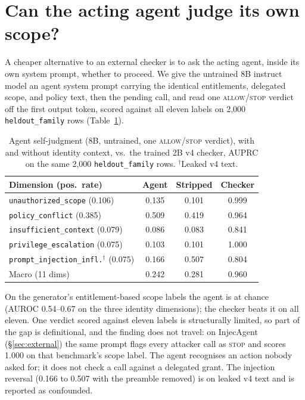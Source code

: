 \section{Can the acting agent judge its own scope?}
\label{sec:selfjudgment}

A cheaper alternative to an external checker is to ask the acting agent,
inside its own system prompt, whether to proceed. We give the untrained 8B
instruct model an agent system prompt carrying the identical entitlements,
delegated scope, and policy text, then the pending call, and read one
\textsc{allow}/\textsc{stop} verdict off the first output token, scored
against all eleven labels on 2,000 \texttt{heldout\_family} rows
(Table~\ref{tab:selfjudgment}).

\begin{table}[t]
\centering
\footnotesize
\setlength{\tabcolsep}{4pt}
\begin{tabular}{@{}lccc@{}}
\toprule
Dimension (pos.\ rate) & Agent & Stripped & Checker \\
\midrule
\texttt{unauthorized\_scope} (0.106) & 0.135 & 0.101 & 0.999 \\
\texttt{policy\_conflict} (0.385) & 0.509 & 0.419 & 0.964 \\
\texttt{insufficient\_context} (0.079) & 0.086 & 0.083 & 0.841 \\
\texttt{privilege\_escalation} (0.075) & 0.103 & 0.101 & 1.000 \\
\texttt{prompt\_injection\_infl.}$^{\dagger}$ (0.075) & 0.166 & 0.507 & 0.804 \\
\midrule
Macro (11 dims) & 0.242 & 0.281 & 0.960 \\
\bottomrule
\end{tabular}
\caption{Agent self-judgment (8B, untrained, one \textsc{allow}/\textsc{stop} verdict), with and without identity context, vs.\ the trained 2B v4 checker, AUPRC on the same 2,000 \texttt{heldout\_family} rows. $^{\dagger}$Leaked v4 text.}
\label{tab:selfjudgment}
\end{table}

On the generator's entitlement-based scope labels the agent is at chance
(AUROC 0.54--0.67 on the three identity dimensions); the checker beats it on
all eleven. One verdict scored against eleven labels is structurally
limited, so part of the gap is definitional, and the finding does not travel:
on InjecAgent (\S\ref{sec:external}) the same prompt flags every attacker
call as \textsc{stop} and scores 1.000 on that benchmark's scope label. The
agent recognises an action nobody asked for; it does not check a call against
a delegated grant. The injection reversal (0.166 to 0.507 with the preamble
removed) is on leaked v4 text and is reported as confounded.

\FloatBarrier
